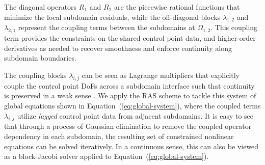 \documentclass[conference]{IEEEtran}
\newcommand{\eqt}[1]{Equation~(\ref{#1})}
\begin{document}

The diagonal operators $R_{1}$ and $R_{2}$ are the piecewise rational functions that minimize the local subdomain residuals, while the off-diagonal blocks $\lambda_{1,2}$ and $\lambda_{2,1}$ represent the coupling terms between the subdomains at $\Omega_{1,2}$. This coupling term provides the constraints on the shared control point data, and higher-order derivatives as needed to recover smoothness and enforce continuity along subdomain boundaries. 

The coupling blocks $\lambda_{i,j}$ can be seen as Lagrange multipliers that explicitly couple the control point DoFs across a subdomain interface such that continuity is preserved in a weak sense \cite{nurbs-book}. We apply the RAS scheme to tackle this system of global equations shown in \eqt{eq:global-system}, where the coupled terms $\lambda_{i,j}$ utilize \textit{lagged} control point data from adjacent subdomains. It is easy to see that through a process of Gaussian elimination to remove the coupled operator dependency in each subdomain, the resulting set of constrained nonlinear equations can be solved iteratively. In a continuous sense, this can also be viewed as a block-Jacobi solver applied to \eqt{eq:global-system}.
\end{document}
